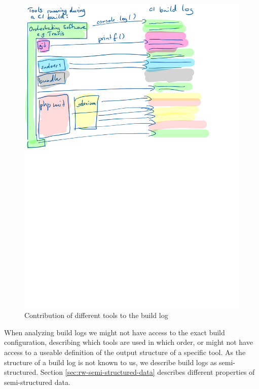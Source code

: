 \documentclass[\myrootdir/main.tex]{subfiles}
\begin{document}
\begin{figure}[h]
	\centering
	\includegraphics[width=\textwidth, trim={0cm 15cm 0cm 0cm}, clip]{img/tool-log-contribution.pdf}
	\caption{Contribution of different tools to the build log}
	\label{fig:tool-log-contribution}
\end{figure}

When analyzing build logs we might not have access to the exact build configuration, describing which tools are used in which order, or might not have access to a useable definition of the output structure of a specific tool.
As the structure of a build log is not known to us, we describe build logs as semi-structured. Section \ref{sec:rw-semi-structured-data} describes different properties of semi-structured data.
\end{document}
